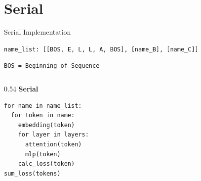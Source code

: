 \documentclass[aspectratio=169]{beamer}
\begin{document}
\section{Serial}
\begin{frame}[fragile]{Serial Implementation}
    \vspace{0.1cm}
    {\large\texttt{name\_list: [[BOS, E, L, L, A, BOS], [name\_B], [name\_C]]}\par}
    \vspace{0.25cm}
    {\large\texttt{BOS = Beginning of Sequence}\par}

    \vspace{0.35cm}
    \begin{columns}[T,onlytextwidth]
        \begin{column}{0.54\textwidth}
            \textbf{Serial}
\begin{lstlisting}[basicstyle=\ttfamily\large]
for name in name_list:
  for token in name:
    embedding(token)
    for layer in layers:
      attention(token)
      mlp(token)
    calc_loss(token)
sum_loss(tokens)
\end{lstlisting}
        \end{column}
    \end{columns}
\end{frame}
\end{document}
